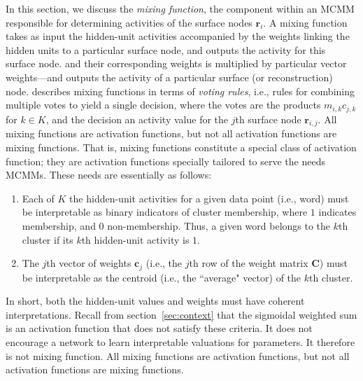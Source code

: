 In this section, we discuss the \emph{mixing function}, 
the component within an MCMM responsible for determining activities of the surface nodes $\textbf{r}_i$.
A mixing function takes as input the hidden-unit activities accompanied by the weights 
linking the hidden units to a particular surface node, and outputs the activity 
for this surface node. and their corresponding weights is  multiplied by 
particular vector weights---and outputs the activity of a particular surface 
(or reconstruction) node.  \citet{saund:94} describes mixing functions in terms of 
\emph{voting rules}, i.e., rules for combining multiple votes to yield a single decision, 
where the votes are the products $m_{i,k}c_{j,k}$ for $k \in K$, and the decision an 
activity value for the $j$th surface node $\textbf{r}_{i,j}$. All mixing functions
are activation functions, but not all activation functions are mixing functions.
That is, mixing functions constitute a special class of activation function; they are 
activation functions
specially tailored to serve the needs MCMMs. These needs are essentially as follows:
\begin{enumerate}
\item Each of $K$ the hidden-unit activities for a given data point (i.e., word) 
must be interpretable as binary indicators of cluster membership, where $1$ 
indicates membership, and $0$ non-membership. Thus, a given word belongs to the 
$k$th cluster if its $k$th hidden-unit activity is $1$.
\item The $j$th vector of weights $\textbf{c}_j$ (i.e., the $j$th row of the weight matrix $\textbf{C}$) must be interpretable as the centroid (i.e., the ``average" vector) of the $k$th cluster. 
\end{enumerate}
In short, both the hidden-unit values and weights must have coherent interpretations. Recall from section~\ref{sec:context} that the sigmoidal weighted sum is an activation function that does not satisfy these criteria. It does not encourage a network to learn interpretable valuations for parameters. It therefore is not mixing function. All mixing functions
are activation functions, but not all activation functions are mixing functions.


